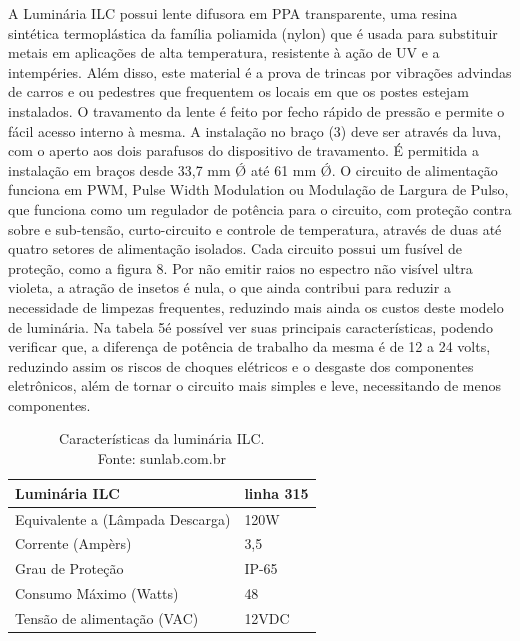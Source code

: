 \begin{enumerate}
	A Luminária ILC possui lente difusora em PPA transparente, uma resina sintética termoplástica da família poliamida (nylon) que é usada para substituir metais em aplicações de alta temperatura, resistente à ação de UV e a intempéries. Além disso, este material é a prova de trincas por vibrações advindas de carros e ou pedestres que frequentem os locais em que os postes estejam instalados. O travamento da lente é feito por fecho rápido de pressão e permite o fácil acesso interno à mesma. A instalação no braço (3) deve ser através da luva, com o aperto aos dois parafusos do dispositivo de travamento. É permitida a instalação em braços desde 33,7 mm Ǿ até 61 mm Ǿ. 
	O circuito de alimentação funciona em PWM, Pulse Width Modulation ou Modulação de Largura de Pulso, que funciona como um regulador de potência para o circuito, com proteção contra sobre e sub-tensão, curto-circuito e controle de temperatura, através de duas até quatro setores de alimentação isolados. Cada circuito possui um fusível de proteção, como a figura 8. Por não emitir raios no espectro não visível ultra violeta, a atração de insetos é nula, o que ainda contribui para reduzir a necessidade de limpezas frequentes, reduzindo mais ainda os custos deste modelo de luminária. Na tabela 5é possível ver suas principais características, podendo verificar que, a diferença de potência de trabalho da mesma é de 12 a 24 volts, reduzindo assim os riscos de choques elétricos e o desgaste dos componentes eletrônicos, além de tornar o circuito mais simples e leve, necessitando de menos componentes.


\begin{table}[h]
\center
\caption{Características da luminária ILC. \\ Fonte: sunlab.com.br}
\begin{tabular}{|l|l|}
\hline
Luminária ILC                    & linha 315 \\ \hline
Equivalente a (Lâmpada Descarga) & 120W      \\ \hline
Corrente (Ampèrs)                & 3,5       \\ \hline
Grau de Proteção                 & IP-65     \\ \hline
Consumo Máximo (Watts)           & 48        \\ \hline
Tensão de alimentação (VAC)      & 12VDC     \\ \hline
\end{tabular}
\end{table}


\end{enumerate}
